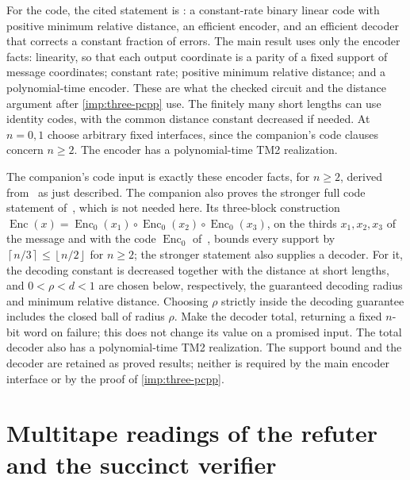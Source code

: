 \documentclass[11pt,letterpaper]{article}
\theoremstyle{definition}
\theoremstyle{remark}
\newcommand{\ceil}[1]{\left\lceil #1\right\rceil}
\newcommand{\floor}[1]{\left\lfloor #1\right\rfloor}
\begin{document}
For the code, the cited statement is \cite[Lemma~26]{CW19}: a
constant-rate binary linear code with positive minimum relative
distance, an efficient encoder, and an efficient decoder that corrects
a constant fraction of errors. The main result uses only the encoder
facts: linearity, so that each output coordinate is a parity of a
fixed support of message coordinates; constant rate; positive minimum
relative distance; and a polynomial-time encoder. These are what the
checked circuit and the distance argument after \cref{imp:three-pcpp}
use. The finitely many short lengths can use identity codes, with the
common distance constant decreased if needed. At \(n=0,1\) choose
arbitrary fixed interfaces, since the companion's code clauses
concern \(n\ge2\). The encoder has a polynomial-time TM2 realization.

The companion's code input is exactly these encoder facts, for
\(n\ge2\), derived from~\cite[Lemma~26]{CW19} as just described. The
companion also proves the stronger full code statement
of~\cite[Lemma~27]{CW19}, which is not needed here. Its three-block
construction
\(\operatorname{Enc}(x)=\operatorname{Enc}_0(x_1)\circ
\operatorname{Enc}_0(x_2)\circ\operatorname{Enc}_0(x_3)\), on the
thirds \(x_1,x_2,x_3\) of the message and with the code
\(\operatorname{Enc}_0\) of~\cite[Lemma~26]{CW19}, bounds every support
by \(\ceil{n/3}\le\floor{n/2}\) for \(n\ge2\); the stronger statement
also supplies a decoder. For it, the decoding constant is decreased together with the
distance at short lengths, and \(0<\rho<d<1\) are chosen below,
respectively, the guaranteed decoding radius and minimum relative
distance. Choosing \(\rho\) strictly inside the decoding guarantee
includes the closed ball of radius \(\rho\). Make the decoder total,
returning a fixed \(n\)-bit word on failure; this does not change its
value on a promised input. The total decoder also has a
polynomial-time TM2 realization. The support bound and the decoder are
retained as proved results; neither is required by the main encoder
interface or by the proof of \cref{imp:three-pcpp}.

\section{Multitape readings of the refuter and the succinct verifier}\label{app:multitape}
\end{document}
